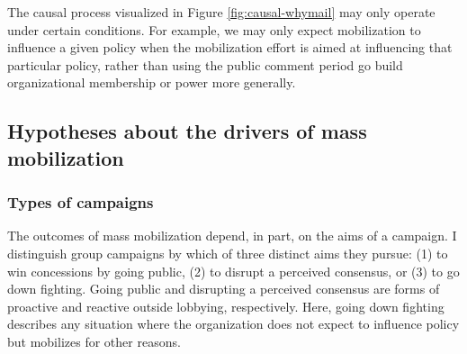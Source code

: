 \documentclass[
      12pt,
        ]{article}
\begin{document}
The causal process visualized in Figure
\ref{fig:causal-whymail} may only operate under certain conditions. For example, we may only expect mobilization to influence a given policy when the mobilization effort is aimed at influencing that particular policy, rather than using the public comment period go build organizational membership or power more generally.

\hypertarget{hypotheses-about-the-drivers-of-mass-mobilization}{%
\subsection{Hypotheses about the drivers of mass mobilization}\label{hypotheses-about-the-drivers-of-mass-mobilization}}

\hypertarget{types-of-campaigns}{%
\subsubsection{Types of campaigns}\label{types-of-campaigns}}

The outcomes of mass mobilization depend, in part, on the aims of a
campaign. I distinguish group campaigns by which of three distinct aims
they pursue: (1) to win concessions by going public, (2) to disrupt a
perceived consensus, or (3) to go down fighting. Going public and
disrupting a perceived consensus are forms of proactive and reactive
outside lobbying, respectively. Here, going down fighting describes any
situation where the organization does not expect to influence policy but
mobilizes for other reasons.
\end{document}

